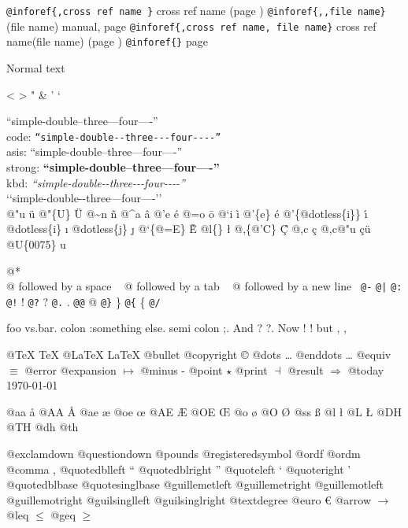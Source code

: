 \documentclass{book}
\begin{document}
\texttt{@inforef\{,cross ref name \}} cross ref name (page \pageref{anchor:})
\texttt{@inforef\{,,file name\}} (file name) manual, page \pageref{anchor:}
\texttt{@inforef\{,cross ref name, file name\}} cross ref name(file name) (page \pageref{anchor:})
\texttt{@inforef\{\}} page \pageref{anchor:}



Normal text

<
>
"
\&
'
`

``simple-double--three---four----''\leavevmode{}\\
code: \texttt{``simple-double{-}{-}three{-}{-}{-}four{-}{-}{-}-''} \leavevmode{}\\
asis: ``simple-double--three---four----'' \leavevmode{}\\
strong: \textbf{``simple-double--three---four----''} \leavevmode{}\\
kbd: {\ttfamily\textsl{``simple-double{-}{-}three{-}{-}{-}four{-}{-}{-}-''}} \leavevmode{}\\

`\hbox{}`simple-double-\hbox{}-three---four----'\hbox{}'\leavevmode{}\\


@"u \"{u} 
@"\{U\} \"{U} 
@\~{}n \~{n}
@\^{}a \^{a}
@'e \'{e}
@=o \={o}
@`i \`{i}
@'\{e\} \'{e}
@'\{@dotless\{i\}\} \'{\i{}} 
@dotless\{i\} \i{}
@dotless\{j\} \j{}
@`\{@=E\} \`{\={E}} 
@l\{\} \l{}
@,\{@'C\} \c{\'{C}}
@,c \c{c}
@,c@"u \c{c}\"{u} \leavevmode{}\\

@U\{0075\} u

@* \leavevmode{}\\
@ followed by a space
\ {}
@ followed by a tab
\ {}
@ followed by a new line
\ {}\texttt{@-} \-{}
\texttt{@|} 
\texttt{@:} \@
\texttt{@!} \@!
\texttt{@?} \@?
\texttt{@.} \@.
\texttt{@@} @
\texttt{@\}} \}
\texttt{@\{} \{
\texttt{@/} 

foo vs.\@ bar. 
colon :\@And something else.
semi colon ;\@.
And ? ?\@.
Now ! !\@@
but , ,\@

@TeX \TeX{}
@LaTeX \LaTeX{}
@bullet \textbullet{}
@copyright \copyright{}
@dots \dots{}\@
@enddots \dots{}
@equiv $\equiv{}$
@error 
@expansion $\mapsto{}$
@minus -
@point $\star{}$
@print $\dashv{}$
@result $\Rightarrow{}$
@today \today{}

@aa \aa{}
@AA \AA{}
@ae \ae{}
@oe \oe{}
@AE \AE{}
@OE \OE{}
@o \o{}
@O \O{}
@ss \ss{}
@l \l{}
@L \L{}
@DH \DH{}
@TH \TH{}
@dh \dh{}
@th \th{}

@exclamdown \textexclamdown{}
@questiondown \textquestiondown{}
@pounds \textsterling{}
@registeredsymbol \circledR{}
@ordf \textordfeminine{}
@ordm \textordmasculine{}
@comma ,
@quotedblleft \textquotedblleft{}
@quotedblright \textquotedblright{}
@quoteleft \textquoteleft{}
@quoteright \textquoteright{}
@quotedblbase \quotedblbase{}
@quotesinglbase \quotesinglbase{}
@guillemetleft \guillemotleft{}
@guillemetright \guillemotright{}
@guillemotleft \guillemotleft{}
@guillemotright \guillemotright{}
@guilsinglleft \guilsinglleft{}
@guilsinglright \guilsinglright{}
@textdegree \textdegree{}
@euro \euro{}
@arrow $\rightarrow{}$
@leq $\leq{}$
@geq $\geq{}$
\end{document}
